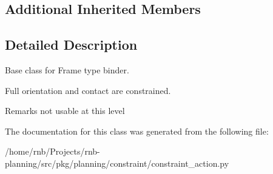\subsection*{Additional Inherited Members}


\subsection{Detailed Description}
Base class for Frame type binder. 

Full orientation and contact are constrained. \begin{DoxyRemark}{Remarks}
not usable at this level 
\end{DoxyRemark}


The documentation for this class was generated from the following file\+:\begin{DoxyCompactItemize}
\item 
/home/rnb/\+Projects/rnb-\/planning/src/pkg/planning/constraint/constraint\+\_\+action.\+py\end{DoxyCompactItemize}
